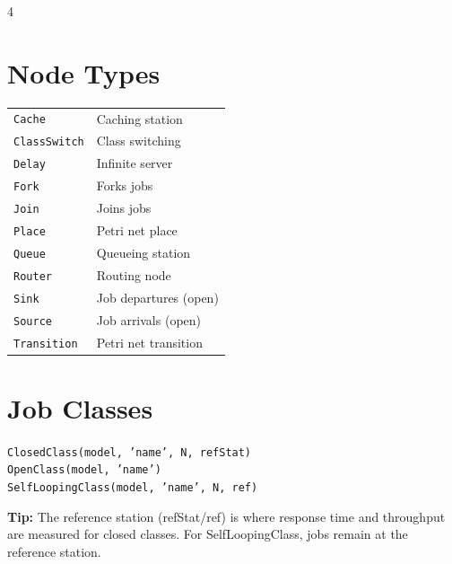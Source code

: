 \documentclass[9pt,landscape,a4paper]{extarticle}
\begin{document}
\vspace{0.1em}

\begin{multicols}{4}

\section*{Node Types}
\begin{tabular}{@{}ll@{}}
\texttt{Cache} & Caching station \\
\texttt{ClassSwitch} & Class switching \\
\texttt{Delay} & Infinite server \\
\texttt{Fork} & Forks jobs \\
\texttt{Join} & Joins jobs \\
\texttt{Place} & Petri net place \\
\texttt{Queue} & Queueing station \\
\texttt{Router} & Routing node \\
\texttt{Sink} & Job departures (open) \\
\texttt{Source} & Job arrivals (open) \\
\texttt{Transition} & Petri net transition \\
\end{tabular}

\section*{Job Classes}
\texttt{ClosedClass(model, 'name', N, refStat)}\\
\texttt{OpenClass(model, 'name')}\\
\texttt{SelfLoopingClass(model, 'name', N, ref)}

\begin{tipbox}
\textbf{Tip:} The reference station (refStat/ref) is where response time and throughput are measured for closed classes. For SelfLoopingClass, jobs remain at the reference station.
\end{tipbox}


\end{multicols}
\end{document}
